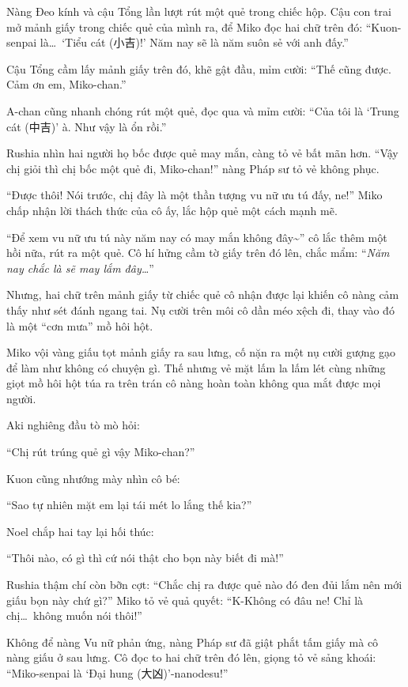 \documentclass[../main.tex]{subfiles}
\begin{document}
Nàng Đeo kính và cậu Tổng lần lượt rút một quẻ trong chiếc hộp. Cậu con trai mở mảnh giấy trong chiếc quẻ của mình ra, để Miko đọc hai chữ trên đó: ``Kuon-senpai là\dots\ `Tiểu cát (小吉)!' Năm nay sẽ là năm suôn sẻ với anh đấy.''

Cậu Tổng cầm lấy mảnh giấy trên đó, khẽ gật đầu, mỉm cười: ``Thế cũng được. Cảm ơn em, Miko-chan.''

A-chan cũng nhanh chóng rút một quẻ, đọc qua và mỉm cười: ``Của tôi là `Trung cát (中吉)' à. Như vậy là ổn rồi.''

Rushia nhìn hai người họ bốc được quẻ may mắn, càng tỏ vẻ bất mãn hơn. ``Vậy chị giỏi thì chị bốc một quẻ đi, Miko-chan!'' nàng Pháp sư tỏ vẻ không phục.

``Được thôi! Nói trước, chị đây là một thần tượng vu nữ ưu tú đấy, ne!'' Miko chấp nhận lời thách thức của cô ấy, lắc hộp quẻ một cách mạnh mẽ.

``Để xem vu nữ ưu tú này năm nay có may mắn không đây\~{}'' cô lắc thêm một hồi nữa, rút ra một quẻ. Cô hí hửng cầm tờ giấy trên đó lên, chắc mẩm: ``\textit{Năm nay chắc là sẽ may lắm đây\dots}''

Nhưng, hai chữ trên mảnh giấy từ chiếc quẻ cô nhận được lại khiến cô nàng cảm thấy như sét đánh ngang tai. Nụ cười trên môi cô dần méo xệch đi, thay vào đó là một ``cơn mưa'' mồ hôi hột.

Miko vội vàng giấu tọt mảnh giấy ra sau lưng, cố nặn ra một nụ cười gượng gạo để làm như không có chuyện gì. Thế nhưng vẻ mặt lấm la lấm lét cùng những giọt mồ hôi hột túa ra trên trán cô nàng hoàn toàn không qua mắt được mọi người.

Aki nghiêng đầu tò mò hỏi:

``Chị rút trúng quẻ gì vậy Miko-chan?''

Kuon cũng nhướng mày nhìn cô bé:

``Sao tự nhiên mặt em lại tái mét lo lắng thế kia?''

Noel chắp hai tay lại hối thúc:

``Thôi nào, có gì thì cứ nói thật cho bọn này biết đi mà!''

Rushia thậm chí còn bỡn cợt: ``Chắc chị ra được quẻ nào đó đen đủi lắm nên mới giấu bọn này chứ gì?'' Miko tỏ vẻ quả quyết: ``K-Không có đâu ne! Chỉ là chị\dots\ không muốn nói thôi!''

Không để nàng Vu nữ phản ứng, nàng Pháp sư đã giật phắt tấm giấy mà cô nàng giấu ở sau lưng. Cô đọc to hai chữ trên đó lên, giọng tỏ vẻ sảng khoái: ``Miko-senpai là `Đại hung (大凶)'-nanodesu!''
\end{document}
